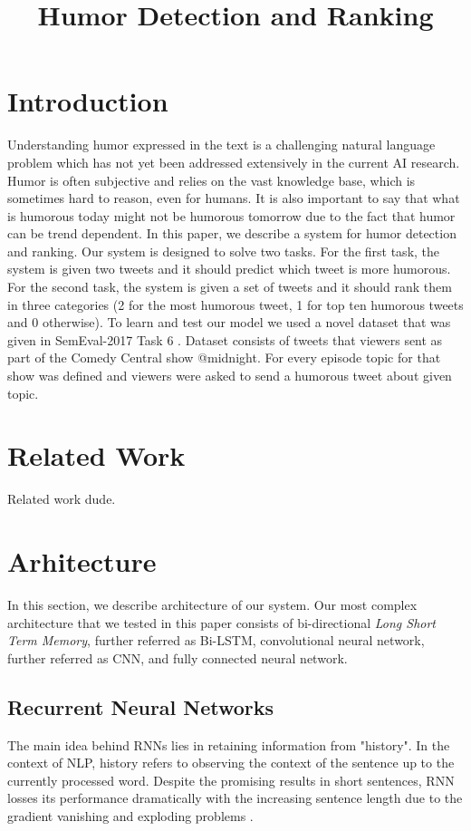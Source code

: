 \documentclass[10pt, a4paper]{article}
\title{Humor Detection and Ranking}
\begin{document}
\maketitleabstract

\section{Introduction}

Understanding humor expressed in the text is a challenging natural language problem which has not yet been addressed extensively in the current AI research. Humor is often subjective and relies on the vast knowledge base, which is sometimes hard to reason, even for humans. It is also important to say that what is humorous today might not be humorous tomorrow due to the fact that humor can be trend dependent.
In this paper, we describe a system for humor detection and ranking. Our system is designed to solve two tasks. For the first task, the system is given two tweets and it should predict which tweet is more humorous. For the second task, the system is given a set of tweets and it should rank them in three categories (2 for the most humorous tweet, 1 for top ten humorous tweets and 0 otherwise). 
To learn and test our model we used a novel dataset that was given in SemEval-2017 Task 6 \citep{potash2016hashtagwars}. Dataset consists of tweets that viewers sent as part of the Comedy Central show @midnight. For every episode topic for that show was defined and viewers were asked to send a humorous tweet about given topic. 

\section{Related Work}

Related work dude.

\section{Arhitecture}

In this section, we describe architecture of our system. Our most complex architecture that we tested in this paper consists of bi-directional \emph{Long Short Term Memory}, further referred as Bi-LSTM, convolutional neural network, further referred as CNN, and fully connected neural network.

\subsection{Recurrent Neural Networks}

The main idea behind RNNs lies in retaining information from "history". In the context of NLP, history refers to observing the context of the sentence up to the currently processed word. Despite the promising results in short sentences, RNN losses its performance dramatically with the increasing sentence length due to the gradient vanishing \cite{bengio1994learning} and exploding problems \cite{pascanu2013difficulty}.
\end{document}
